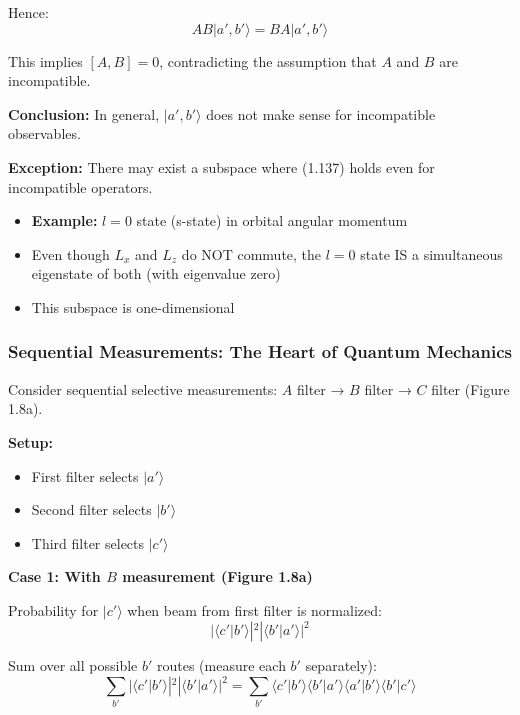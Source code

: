 \documentclass[11pt,a4paper]{article}
\begin{document}
Hence:
\begin{equation}
AB|a', b'\rangle = BA|a', b'\rangle
\tag{1.137}
\end{equation}

This implies $[A, B] = 0$, contradicting the assumption that $A$ and $B$ are incompatible.

\textbf{Conclusion:} In general, $|a', b'\rangle$ does not make sense for incompatible observables.

\textbf{Exception:} There may exist a subspace where (1.137) holds even for incompatible operators.
\begin{itemize}
\item \textbf{Example:} $l = 0$ state (s-state) in orbital angular momentum
\item Even though $L_x$ and $L_z$ do NOT commute, the $l = 0$ state IS a simultaneous eigenstate of both (with eigenvalue zero)
\item This subspace is one-dimensional
\end{itemize}

\subsubsection{Sequential Measurements: The Heart of Quantum Mechanics}

Consider sequential selective measurements: $A$ filter → $B$ filter → $C$ filter (Figure 1.8a).

\textbf{Setup:}
\begin{itemize}
\item First filter selects $|a'\rangle$
\item Second filter selects $|b'\rangle$
\item Third filter selects $|c'\rangle$
\end{itemize}

\textbf{Case 1: With $B$ measurement (Figure 1.8a)}

Probability for $|c'\rangle$ when beam from first filter is normalized:
\begin{equation}
|\langle c'|b'\rangle|^2|\langle b'|a'\rangle|^2
\tag{1.138}
\end{equation}

Sum over all possible $b'$ routes (measure each $b'$ separately):
\begin{equation}
\sum_{b'}|\langle c'|b'\rangle|^2|\langle b'|a'\rangle|^2 = \sum_{b'}\langle c'|b'\rangle\langle b'|a'\rangle\langle a'|b'\rangle\langle b'|c'\rangle
\tag{1.139}
\end{equation}
\end{document}
